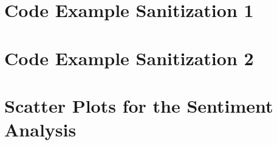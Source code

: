 \begin{appendix}
	\chapter{Code Example Sanitization 1}
 		
 	\chapter{Code Example Sanitization 2}
		
	\chapter{Scatter Plots for the Sentiment Analysis}
		
\end{appendix}





\newpage

%
\thispagestyle{empty}


